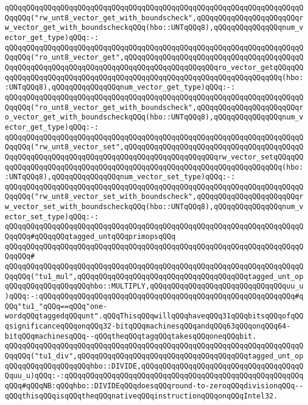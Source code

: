 \verb|qQQqqQQqqQQqqQQqqQQqqQQqqQQqqQQqqQQqqQQqqQQqqQQqqQQqqQQqqQQqqQQqqQQqqQQqqQQq("rw_unt8_vector_get_with_boundscheck",qQQqqQQqqQQqqQQqqQQqqQQqrw_vector_get_with_boundscheckqQQq(hbo::UNTqQQq8),qQQqqQQqqQQqqQQqnum_vector_get_type)qQQq:-:|\newline
\verb|qQQqqQQqqQQqqQQqqQQqqQQqqQQqqQQqqQQqqQQqqQQqqQQqqQQqqQQqqQQqqQQqqQQqqQQqqQQq("ro_unt8_vector_get",qQQqqQQqqQQqqQQqqQQqqQQqqQQqqQQqqQQqqQQqqQQqqQQqqQQqqQQqqQQqqQQqqQQqqQQqqQQqqQQqqQQqqQQqqQQqro_vector_getqQQqqQQqqQQqqQQqqQQqqQQqqQQqqQQqqQQqqQQqqQQqqQQqqQQqqQQqqQQqqQQqqQQqqQQq(hbo::UNTqQQq8),qQQqqQQqqQQqqQQqnum_vector_get_type)qQQq:-:|\newline
\verb|qQQqqQQqqQQqqQQqqQQqqQQqqQQqqQQqqQQqqQQqqQQqqQQqqQQqqQQqqQQqqQQqqQQqqQQqqQQq("ro_unt8_vector_get_with_boundscheck",qQQqqQQqqQQqqQQqqQQqqQQqro_vector_get_with_boundscheckqQQq(hbo::UNTqQQq8),qQQqqQQqqQQqqQQqnum_vector_get_type)qQQq:-:|\newline
\verb|qQQqqQQqqQQqqQQqqQQqqQQqqQQqqQQqqQQqqQQqqQQqqQQqqQQqqQQqqQQqqQQqqQQqqQQqqQQq("rw_unt8_vector_set",qQQqqQQqqQQqqQQqqQQqqQQqqQQqqQQqqQQqqQQqqQQqqQQqqQQqqQQqqQQqqQQqqQQqqQQqqQQqqQQqqQQqqQQqqQQqrw_vector_setqQQqqQQqqQQqqQQqqQQqqQQqqQQqqQQqqQQqqQQqqQQqqQQqqQQqqQQqqQQqqQQqqQQqqQQq(hbo::UNTqQQq8),qQQqqQQqqQQqqQQqnum_vector_set_type)qQQq:-:|\newline
\verb|qQQqqQQqqQQqqQQqqQQqqQQqqQQqqQQqqQQqqQQqqQQqqQQqqQQqqQQqqQQqqQQqqQQqqQQqqQQq("rw_unt8_vector_set_with_boundscheck",qQQqqQQqqQQqqQQqqQQqqQQqrw_vector_set_with_boundscheckqQQq(hbo::UNTqQQq8),qQQqqQQqqQQqqQQqnum_vector_set_type)qQQq:-:|\newline
\newline
\verb|qQQqqQQqqQQqqQQqqQQqqQQqqQQqqQQqqQQqqQQqqQQqqQQqqQQqqQQqqQQqqQQqqQQqqQQqqQQq#qQQqqQQqtagged_untqQQqprimopsqQQq|\newline
\verb|qQQqqQQqqQQqqQQqqQQqqQQqqQQqqQQqqQQqqQQqqQQqqQQqqQQqqQQqqQQqqQQqqQQqqQQqqQQq#|\newline
\verb|qQQqqQQqqQQqqQQqqQQqqQQqqQQqqQQqqQQqqQQqqQQqqQQqqQQqqQQqqQQqqQQqqQQqqQQqqQQq("tu1_mul",qQQqqQQqqQQqqQQqqQQqqQQqqQQqqQQqqQQqqQQqtagged_unt_opqQQqqQQqqQQqqQQqqQQqhbo::MULTIPLY,qQQqqQQqqQQqqQQqqQQqqQQqqQQqqQQquu_u)qQQq:-:qQQqqQQqqQQqqQQqqQQqqQQqqQQqqQQqqQQqqQQqqQQqqQQqqQQqqQQqqQQq#qQQq"tu1_"qQQq==qQQq"one-wordqQQqtaggedqQQqunt".qQQqThisqQQqwillqQQqhaveqQQq31qQQqbitsqQQqofqQQqsignificanceqQQqonqQQq32-bitqQQqmachinesqQQqandqQQq63qQQqonqQQq64-bitqQQqmachinesqQQq--qQQqtheqQQqtagqQQqtakesqQQqoneqQQqbit.|\newline
\verb|qQQqqQQqqQQqqQQqqQQqqQQqqQQqqQQqqQQqqQQqqQQqqQQqqQQqqQQqqQQqqQQqqQQqqQQqqQQq("tu1_div",qQQqqQQqqQQqqQQqqQQqqQQqqQQqqQQqqQQqqQQqtagged_unt_opqQQqqQQqqQQqqQQqqQQqhbo::DIVIDE,qQQqqQQqqQQqqQQqqQQqqQQqqQQqqQQqqQQqqQQquu_u)qQQq:-:qQQqqQQqqQQqqQQqqQQqqQQqqQQqqQQqqQQqqQQqqQQqqQQqqQQqqQQqqQQq#qQQqNB:qQQqhbo::DIVIDEqQQqdoesqQQqround-to-zeroqQQqdivisionqQQq--qQQqthisqQQqisqQQqtheqQQqnativeqQQqinstructionqQQqonqQQqIntel32.|\newline
